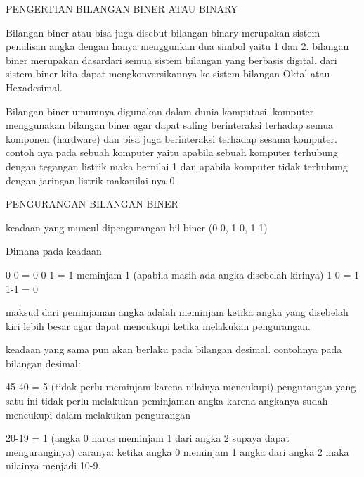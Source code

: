 PENGERTIAN BILANGAN BINER ATAU BINARY

Bilangan biner atau bisa juga disebut bilangan binary merupakan sistem penulisan angka dengan hanya menggunkan dua simbol yaitu 1 dan 2. bilangan biner merupakan dasardari semua sistem bilangan yang berbasis digital. dari sistem biner kita dapat mengkonversikannya ke sistem bilangan Oktal atau Hexadesimal.

Bilangan biner umumnya digunakan dalam dunia komputasi. komputer menggunakan bilangan biner agar dapat saling berinteraksi terhadap semua komponen (hardware) dan bisa juga berinteraksi terhadap sesama komputer. contoh nya pada sebuah komputer yaitu apabila sebuah komputer terhubung dengan tegangan listrik maka bernilai 1 dan apabila komputer tidak terhubung dengan jaringan listrik makanilai nya 0.

PENGURANGAN BILANGAN BINER

keadaan yang muncul dipengurangan bil biner
(0-0, 1-0, 1-1)

Dimana pada keadaan

	0-0 = 0
	0-1 = 1 meminjam 1 (apabila masih ada angka disebelah kirinya)
	1-0 = 1
	1-1 = 0
	
maksud dari peminjaman angka adalah meminjam ketika angka yang disebelah kiri lebih besar agar dapat mencukupi ketika melakukan pengurangan.

keadaan yang sama pun akan berlaku pada bilangan desimal.
contohnya pada bilangan desimal:

	45-40 = 5 (tidak perlu meminjam karena nilainya mencukupi)
pengurangan yang satu ini tidak perlu melakukan peminjaman angka karena angkanya sudah mencukupi dalam melakukan pengurangan
				
	20-19 = 1 (angka 0 harus meminjam 1 dari angka 2 supaya dapat menguranginya)
		caranya: ketika angka 0 meminjam 1 angka dari angka 2 maka nilainya menjadi 10-9.
